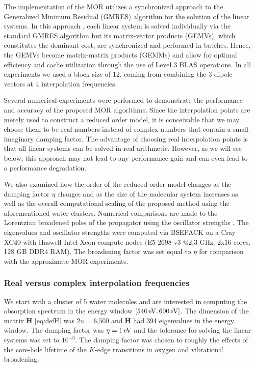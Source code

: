 The implementation of the MOR utilizes a synchronized approach to the
Generalized Minimum Residual (GMRES)\cite{Walker88_152} algorithm for the
solution of the linear systems. In this approach \cite{shak2016}, each linear
system is solved individually via the standard GMRES algorithm but its
matrix-vector products (GEMVs), which constitutes the dominant cost, are synchronized
and performed in batches. Hence, the GEMVs become matrix-matrix
products (GEMMs) and allow for optimal efficiency and cache utilization through
the use of Level 3 BLAS operations. In all experiments we used a block size of
12, coming from combining the 3 dipole vectors at 4 interpolation frequencies.

Several numerical experiments were performed to demonstrate the performance and accuracy of the proposed MOR algorithms. Since the interpolation points are merely used to construct a reduced order model, it is conceivable that we may choose them to be real numbers instead of complex numbers that contain a small imaginary damping factor.  The advantage of choosing real interpolation points is that all linear systems can be solved in real arithmetic. However, as we will see below, this approach may not lead to any performance gain and can even lead to a performance degradation.

We also examined how the order of the reduced order model changes as the damping factor $\eta$ changes and as the size of the molecular system increases as well as the overall computational scaling of the proposed method using the aforementioned water clusters. Numerical comparisons are made to the Lorentzian broadened poles of the propagator using the oscillator strengths \cite{Ball64_844,Harris69_3947,McKoy75_1168}. The eigenvalues and oscillator strengths were computed via BSEPACK\cite{bsepack,SJYDL2016} on a Cray XC40 with Haswell Intel Xeon compute nodes (E5-2698 v3 @2.3 GHz, 2x16 cores, 128 GB DDR4 RAM). The broadening factor was set equal to $\eta$ for comparison with the approximate MOR experiments.

\subsubsection{Real versus complex interpolation frequencies}
\label{sec:MORresults-points}

We start with a cluster of 5 water molecules and are interested in computing
the absorption spectrum in the energy window $[540\,\mathrm{eV},600\,\mathrm{eV}]$. The
dimension of the matrix $\mathbf{H}$ \cref{eq:defH} was $2n = 6$,500 and $\mathbf{H}$ had
394 eigenvalues in the energy window. The damping factor was $\eta = 1\,\mathrm{eV}$
and the tolerance for solving the linear systems was set to $10^{-6}$. The
damping factor was chosen to roughly  the effects of the core-hole
lifetime of the $K$-edge transitions in oxygen and vibrational
broadening\cite{Stohr_book}. 

